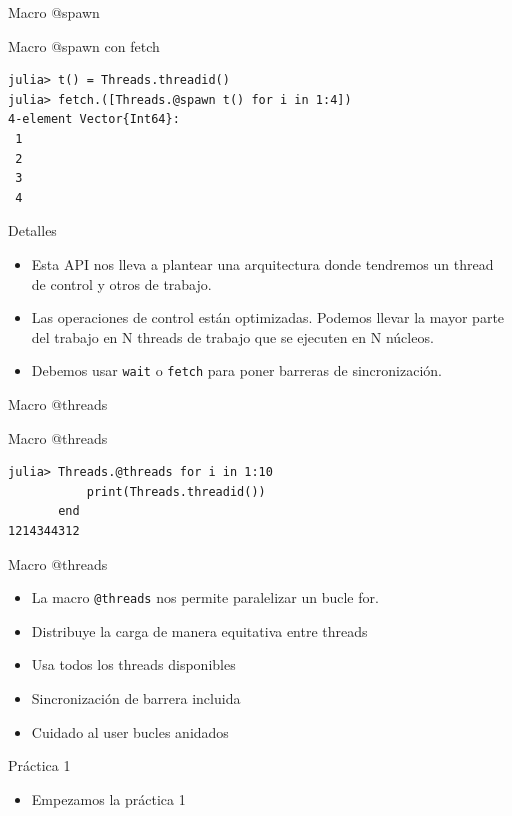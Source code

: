 \documentclass[bigger]{beamer}
\begin{document}
\begin{frame}[label={sec:orge21e676},fragile]{Macro @spawn}
 \begin{block}{Macro @spawn con fetch}
\begin{verbatim}
julia> t() = Threads.threadid()
julia> fetch.([Threads.@spawn t() for i in 1:4])
4-element Vector{Int64}:
 1
 2
 3
 4
\end{verbatim}
\end{block}
\end{frame}

\begin{frame}[label={sec:orgb61a73c},fragile]{Detalles}
 \begin{itemize}
\item Esta API nos lleva a plantear una arquitectura donde tendremos un thread de \alert{control} y otros de \alert{trabajo}.
\item Las operaciones de control están optimizadas. Podemos llevar la mayor parte del trabajo en N threads de trabajo que se ejecuten en N núcleos.
\item Debemos usar \texttt{wait} o \texttt{fetch} para poner barreras de sincronización.
\end{itemize}
\end{frame}

\begin{frame}[label={sec:orgf6757fd},fragile]{Macro @threads}
 \begin{block}{Macro @threads}
\begin{verbatim}
julia> Threads.@threads for i in 1:10
           print(Threads.threadid())
       end
1214344312
\end{verbatim}
\end{block}
\end{frame}

\begin{frame}[label={sec:org37a5a90},fragile]{Macro @threads}
 \begin{itemize}
\item La macro \texttt{@threads} nos permite paralelizar un bucle for.
\item Distribuye la carga de manera equitativa entre threads
\item Usa todos los threads disponibles
\item Sincronización de barrera incluida
\item Cuidado al user bucles anidados
\end{itemize}
\end{frame}

\begin{frame}[label={sec:orgf65c2d1}]{Práctica 1}
\begin{itemize}
\item Empezamos la práctica 1
\end{itemize}
\end{frame}
\end{document}
